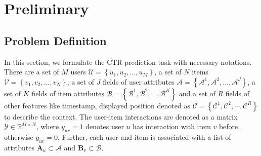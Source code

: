 \section{Preliminary}
\subsection{Problem Definition}
In this section, we formulate the CTR prediction task with necessary notations.
There are a set of $M$ users $\mathcal{U} = \left\{u_1,u_2,...,u_M\right\}$, a set of $N$ items $\mathcal{V} = \left\{v_1,v_2,...,v_N\right\}$, a set of $J$ fields of user attributes $\mathcal{A} =  \left\{\mathcal{A}^1,\mathcal{A}^2,...,\mathcal{A}^J\right\}$, a set of $K$ fields of item attributes $\mathcal{B} =  \left\{\mathcal{B}^1,\mathcal{B}^2,...,\mathcal{B}^K\right\}$ and a set of $R$ fields of other features like timestamp, displayed position denoted as $\mathcal{C} =\left\{\mathcal{C}^1,\mathcal{C}^2,\cdots,\mathcal{C}^R\right\}$ to describe the context. 
The user-item interactions are denoted as a matrix $\mathcal{Y}\in\mathbb{R}^{M \times N}$, where $y_{uv} = 1$ denotes user $u$ has interaction with item $v$ before, otherwise $y_{uv}=0$.
Further, each user and item is associated with a list of attributes $\mathbf{A}_u \subset \mathcal{A}$ and $\mathbf{B}_v \subset \mathcal{B}$.
